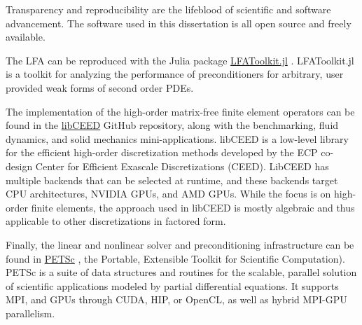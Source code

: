 Transparency and reproducibility are the lifeblood of scientific and software advancement.
The software used in this dissertation is all open source and freely available.

The LFA can be reproduced with the Julia package \href{https://www.github.com/jeremylt/LFAToolkit.jl}{LFAToolkit.jl} \cite{thompson2021toolkit}.
LFAToolkit.jl is a toolkit for analyzing the performance of preconditioners for arbitrary, user provided weak forms of second order PDEs.

The implementation of the high-order matrix-free finite element operators can be found in the \href{https://www.github.com/CEED/libCEED}{libCEED} GitHub repository, along with the benchmarking, fluid dynamics, and solid mechanics mini-applications.
libCEED \cite{libceed, libceed-user-manual, scipy2020} is a low-level library for the efficient high-order discretization methods developed by the ECP co-design Center for Efficient Exascale Discretizations (CEED).
LibCEED has multiple backends that can be selected at runtime, and these backends target CPU architectures, NVIDIA GPUs, and AMD GPUs.
While the focus is on high-order finite elements, the approach used in libCEED is mostly algebraic and thus applicable to other discretizations in factored form.

Finally, the linear and nonlinear solver and preconditioning infrastructure can be found in \href{https://www.mcs.anl.gov/petsc/}{PETSc} \cite{petsc-user-ref}, the Portable, Extensible Toolkit for Scientific Computation).
PETSc is a suite of data structures and routines for the scalable, parallel solution of scientific applications modeled by partial differential equations.
It supports MPI, and GPUs through CUDA, HIP, or OpenCL, as well as hybrid MPI-GPU parallelism.